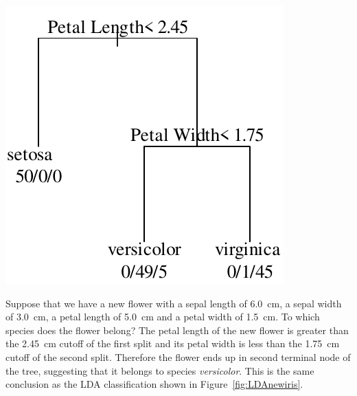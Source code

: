 \noindent\begin{minipage}[t][][b]{.3\textwidth}
\includegraphics[width=\textwidth]{../figures/irisCART.pdf}\\
\end{minipage}
\begin{minipage}[t][][t]{.7\textwidth}
  \label{fig:irisCART}
\end{minipage}

Suppose that we have a new flower with a sepal length of 6.0~cm, a
sepal width of 3.0~cm, a petal length of 5.0~cm and a petal width of
1.5~cm. To which species does the flower belong? The petal length of
the new flower is greater than the 2.45~cm cutoff of the first split
and its petal width is less than the 1.75~cm cutoff of the second
split. Therefore the flower ends up in second terminal node of the
tree, suggesting that it belongs to species \emph{versicolor}.  This
is the same conclusion as the LDA classification shown in
Figure~\ref{fig:LDAnewiris}.


